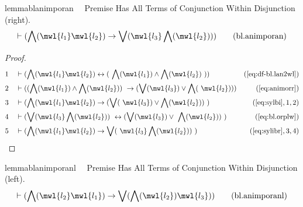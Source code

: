 \begin{restatable}{lemma}{blanimporan}~~ Premise Has All Terms of Conjunction
Within Disjunction (right).
\begin{align}
\vdash ( \bigwedge( \mwl{l_1} \mwl{l_2} ) \rightarrow \bigvee( \mwl{l_3}
    \bigwedge( \mwl{l_2} ) ) )\label{eq:bl.animporan}\tag{bl.animporan}
\end{align}
\end{restatable}

\begin{proof}
\begin{align}
  1 &&  & \vdash ( \bigwedge( \mwl{l_1} \mwl{l_2} ) \leftrightarrow (
     ~\bigwedge( \mwl{l_1} ) \wedge \bigwedge( \mwl{l_2} )
     ~) )&(\mbox{\ref{eq:df-bl.lan2wl}})\notag
  \\ 2 &&  & \vdash ( ( \bigwedge( \mwl{l_1} ) \wedge \bigwedge( \mwl{l_2} ) )
     ~\rightarrow ( \bigvee( \mwl{l_3} ) \vee \bigwedge(
     ~\mwl{l_2} ) ) )&(\mbox{\ref{eq:animorr}})\notag
  \\ 3 &&  & \vdash ( \bigwedge( \mwl{l_1} \mwl{l_2} ) \rightarrow ( \bigvee(
     ~\mwl{l_3} ) \vee \bigwedge( \mwl{l_2} ) )
     ~)&(\mbox{\ref{eq:sylbi}},1,2)\notag
  \\ 4 &&  & \vdash ( \bigvee( \mwl{l_3} \bigwedge( \mwl{l_2} ) )
     ~\leftrightarrow ( \bigvee( \mwl{l_3} ) \vee
     ~\bigwedge( \mwl{l_2} ) )
     ~)&(\mbox{\ref{eq:bl.orplw}})\notag
  \\ 5 &&  & \vdash ( \bigwedge( \mwl{l_1} \mwl{l_2} ) \rightarrow \bigvee(
     ~\mwl{l_3} \bigwedge( \mwl{l_2} ) )
     ~)&(\mbox{\ref{eq:sylibr}},3,4)\notag
\end{align}
\end{proof}

\begin{restatable}{lemma}{blanimporanl}~~ Premise Has All Terms of Conjunction
Within Disjunction (left).
\begin{align}
\vdash ( \bigwedge( \mwl{l_2} \mwl{l_1} ) \rightarrow \bigvee( \bigwedge(
    \mwl{l_2} ) \mwl{l_3} ) )\label{eq:bl.animporanl}\tag{bl.animporanl}
\end{align}
\end{restatable}


